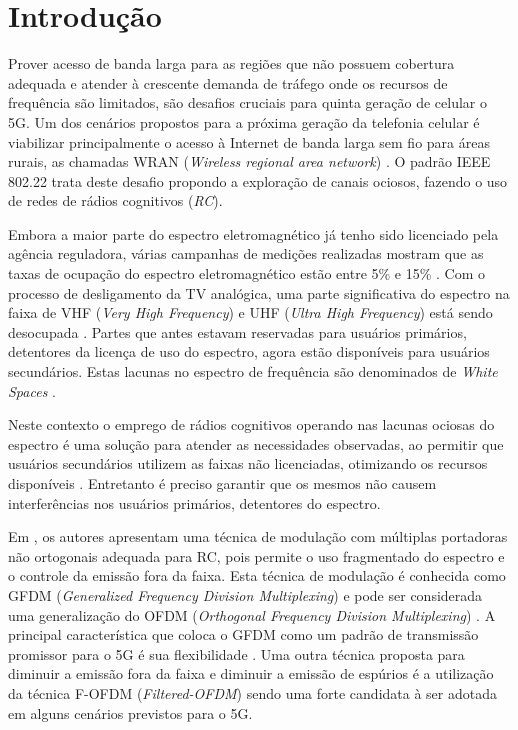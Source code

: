 {\section{Introdução}
Prover acesso de banda larga para as regiões que não possuem cobertura adequada e atender à crescente demanda de tráfego onde os recursos de frequência são limitados, são desafios cruciais para quinta geração de celular o 5G. Um dos cenários propostos para a próxima geração da telefonia celular é viabilizar principalmente o acesso à Internet de banda larga sem fio para áreas rurais, as chamadas WRAN (\textit{Wireless regional area network}) \cite{IEEE_802_22}. O padrão IEEE 802.22 trata deste desafio propondo a exploração de canais ociosos, fazendo o uso de redes de rádios cognitivos (\textit{RC})\cite{wran}. \par
Embora a maior parte do espectro eletromagnético já tenho sido licenciado pela agência reguladora, várias campanhas de medições realizadas mostram que as taxas de ocupação do espectro eletromagnético estão entre 5\% e 15\% \cite{IndoorWS}\cite{White_Space_Capacity}. Com o processo de desligamento da TV analógica, uma parte significativa do espectro na faixa de VHF (\textit{Very High Frequency}) e UHF (\textit{Ultra High Frequency}) está sendo desocupada \cite{White_Space_Capacity,AnalogSwitchOff}. Partes que antes estavam reservadas para usuários primários, detentores da licença de uso do espectro, agora estão disponíveis para usuários secundários. Estas lacunas no espectro de frequência são denominados de \textit{White Spaces} \cite{WSBook}. \par
Neste contexto o emprego de rádios cognitivos operando nas lacunas ociosas do espectro é uma solução para atender as necessidades observadas, ao permitir que usuários secundários utilizem as faixas não licenciadas, otimizando os recursos disponíveis \cite{WSBook}. Entretanto é preciso garantir que os mesmos não causem interferências nos usuários primários, detentores do espectro. \par
Em \cite{gfdm}, os autores apresentam uma técnica de modulação com múltiplas portadoras não ortogonais adequada para RC, pois permite o uso fragmentado do espectro e o controle da emissão fora da faixa. Esta técnica de modulação é conhecida como GFDM (\textit{Generalized Frequency Division Multiplexing}) e pode ser considerada uma generalização do OFDM (\textit{Orthogonal Frequency Division Multiplexing}) \cite{ref_OFDM}. A principal característica que coloca o GFDM como um padrão de transmissão promissor para o 5G é sua flexibilidade \cite{heirOFDM}. Uma outra técnica proposta para diminuir a emissão fora da faixa e diminuir a emissão de espúrios é a utilização da técnica F-OFDM (\textit{Filtered-OFDM}) \cite{fOFDM_hwawei} sendo uma forte candidata à ser adotada em alguns cenários previstos para o 5G. \par
}
